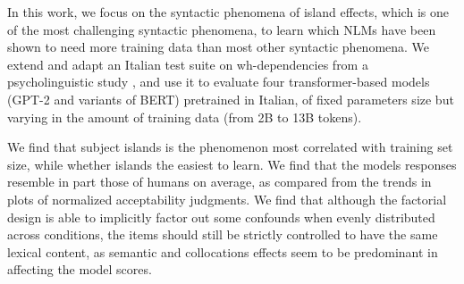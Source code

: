 In this work, we focus on the syntactic phenomena of island effects, which is one of the most challenging syntactic phenomena, to learn which NLMs have been shown to need more training data than most other syntactic phenomena. We extend and adapt an Italian test suite on wh-dependencies from a psycholinguistic study \citep{sprouse2016experimental}, and use it to evaluate four transformer-based models (GPT-2 and variants of BERT) pretrained in Italian, of fixed parameters size but varying in the amount of training data (from 2B to 13B tokens). %

We find that subject islands is the phenomenon most correlated with training set size, while whether islands the easiest to learn.%
We find that the models responses resemble in part those of humans on average, as compared from the trends in plots of normalized acceptability judgments. We find that although the factorial design is able to implicitly factor out some confounds when evenly distributed across conditions, the items should still be strictly controlled to have the same lexical content, as semantic and collocations effects seem to be predominant in affecting the model scores.

